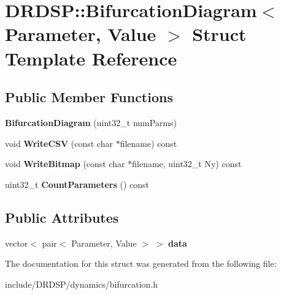 \hypertarget{struct_d_r_d_s_p_1_1_bifurcation_diagram}{\section{D\-R\-D\-S\-P\-:\-:Bifurcation\-Diagram$<$ Parameter, Value $>$ Struct Template Reference}
\label{struct_d_r_d_s_p_1_1_bifurcation_diagram}
}
\subsection*{Public Member Functions}
\begin{DoxyCompactItemize}
\item 
\hypertarget{struct_d_r_d_s_p_1_1_bifurcation_diagram_a265b6bf1645012f9bb9d1cdfb8c0487b}{{\bfseries Bifurcation\-Diagram} (uint32\-\_\-t num\-Parms)}\label{struct_d_r_d_s_p_1_1_bifurcation_diagram_a265b6bf1645012f9bb9d1cdfb8c0487b}

\item 
\hypertarget{struct_d_r_d_s_p_1_1_bifurcation_diagram_a6da951362542e3f26e918d07b5e095e5}{void {\bfseries Write\-C\-S\-V} (const char $\ast$filename) const }\label{struct_d_r_d_s_p_1_1_bifurcation_diagram_a6da951362542e3f26e918d07b5e095e5}

\item 
\hypertarget{struct_d_r_d_s_p_1_1_bifurcation_diagram_a9d747935a1c91b285bb795ae7f1288e5}{void {\bfseries Write\-Bitmap} (const char $\ast$filename, uint32\-\_\-t Ny) const }\label{struct_d_r_d_s_p_1_1_bifurcation_diagram_a9d747935a1c91b285bb795ae7f1288e5}

\item 
\hypertarget{struct_d_r_d_s_p_1_1_bifurcation_diagram_a8f9efb8b6f068845cb5da5e625f30efb}{uint32\-\_\-t {\bfseries Count\-Parameters} () const }\label{struct_d_r_d_s_p_1_1_bifurcation_diagram_a8f9efb8b6f068845cb5da5e625f30efb}

\end{DoxyCompactItemize}
\subsection*{Public Attributes}
\begin{DoxyCompactItemize}
\item 
\hypertarget{struct_d_r_d_s_p_1_1_bifurcation_diagram_a504e275729335dda96037557c158ec39}{vector$<$ pair$<$ Parameter, Value $>$ $>$ {\bfseries data}}\label{struct_d_r_d_s_p_1_1_bifurcation_diagram_a504e275729335dda96037557c158ec39}

\end{DoxyCompactItemize}


The documentation for this struct was generated from the following file\-:\begin{DoxyCompactItemize}
\item 
include/\-D\-R\-D\-S\-P/dynamics/bifurcation.\-h\end{DoxyCompactItemize}
